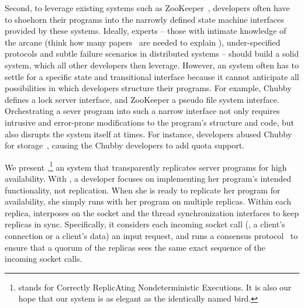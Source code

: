 Second, to leverage existing \smr systems such as
ZooKeeper~\cite{zookeeper}, developers often have to shoehorn their
programs into the narrowly defined state machine interfaces provided by
these \smr systems.  Ideally, experts -- those with intimate knowledge of
the arcane (think how many 
papers~\cite{paxos,paxos:simple,paxos:complex,paxos:live,paxos:practical} are 
needed to explain \paxos),
under-specified~\cite{paxos:practical} \smr protocols and subtle failure
scenarios in distributed systems -- should build a solid \smr system,
which all other developers then leverage. However, an \smr system often
has to settle for a specific state and transitional interface because it
cannot anticipate all possibilities in which developers structure their
programs.  For example, Chubby~\cite{chubby:osdi} defines a lock server
interface, and ZooKeeper a pseudo file system interface.  Orchestrating a
sever program into such a narrow interface not only requires
intrusive and error-prone modifications to the program's structure and
code, but also disrupts the \smr system itself at times. For instance,
developers abused Chubby for storage~\cite{chubby:osdi}, causing the
Chubby developers to add quota support.


We present \xxx,\footnote{\xxx stands for Correctly ReplicAting
  Nondeterministic Executions. It is also our hope that our system is as
  elegant as the identically named bird.} an \smr system that
transparently replicates server programs for high availability.  With
\xxx, a developer focuses on implementing her program's intended
functionality, not replication.  When she is ready to replicate her
program for availability, she simply runs \xxx with her program on
multiple replicas.  Within each replica, \xxx interposes on the socket and
the thread synchronization interfaces to keep replicas in sync.
Specifically, it considers each incoming socket call (\eg, \accept a
client's connection or \recv a client's data) an input request, and
runs a \paxos consensus protocol~\cite{paxos:practical} to ensure that a
quorum of the replicas sees the same exact sequence of the incoming socket calls.


